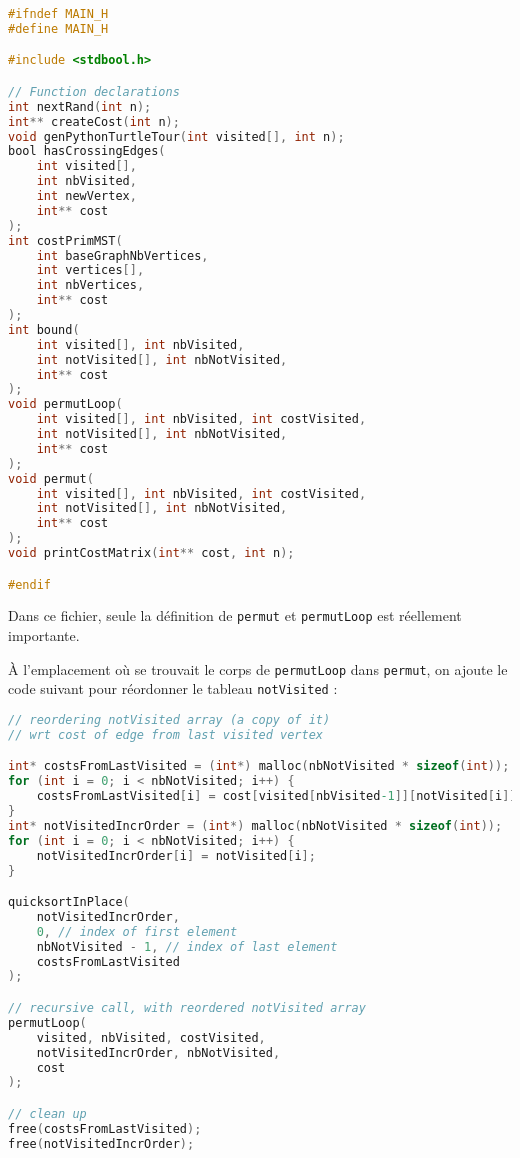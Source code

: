\begin{lstlisting}[language=C, caption={Définitions des fonctions dans le fichier header \texttt{main.h}.}]
#ifndef MAIN_H
#define MAIN_H

#include <stdbool.h>

// Function declarations
int nextRand(int n);
int** createCost(int n);
void genPythonTurtleTour(int visited[], int n);
bool hasCrossingEdges(
    int visited[], 
    int nbVisited, 
    int newVertex, 
    int** cost
);
int costPrimMST(
    int baseGraphNbVertices,
    int vertices[], 
    int nbVertices, 
    int** cost
);
int bound(
    int visited[], int nbVisited, 
    int notVisited[], int nbNotVisited,
    int** cost
);
void permutLoop(
    int visited[], int nbVisited, int costVisited,
    int notVisited[], int nbNotVisited,
    int** cost
);
void permut(
    int visited[], int nbVisited, int costVisited,
    int notVisited[], int nbNotVisited,
    int** cost
);
void printCostMatrix(int** cost, int n);

#endif
\end{lstlisting}

Dans ce fichier, seule la définition de \texttt{permut} et \texttt{permutLoop} est réellement importante.

À l'emplacement où se trouvait le corps de \texttt{permutLoop} dans \texttt{permut}, on ajoute le code suivant pour réordonner le tableau \texttt{notVisited} :

\begin{lstlisting}[language=C, caption={Réordonnancement du tableau \texttt{notVisited} dans \texttt{permut}.}]
// reordering notVisited array (a copy of it)
// wrt cost of edge from last visited vertex

int* costsFromLastVisited = (int*) malloc(nbNotVisited * sizeof(int));
for (int i = 0; i < nbNotVisited; i++) {
    costsFromLastVisited[i] = cost[visited[nbVisited-1]][notVisited[i]];
}
int* notVisitedIncrOrder = (int*) malloc(nbNotVisited * sizeof(int));
for (int i = 0; i < nbNotVisited; i++) {
    notVisitedIncrOrder[i] = notVisited[i];
}

quicksortInPlace(
    notVisitedIncrOrder, 
    0, // index of first element
    nbNotVisited - 1, // index of last element
    costsFromLastVisited
);

// recursive call, with reordered notVisited array
permutLoop(
    visited, nbVisited, costVisited,
    notVisitedIncrOrder, nbNotVisited,
    cost
);

// clean up
free(costsFromLastVisited);
free(notVisitedIncrOrder);
\end{lstlisting}

